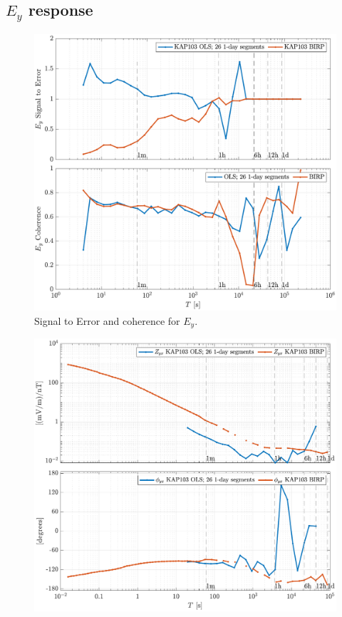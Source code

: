 \documentclass{article}
\begin{document}
\clearpage

\subsection{$E_y$ response}

\begin{figure}[h!]
\centering
\includegraphics[width=\textwidth]{figures/KAP103/SN_compare-E_y.pdf}
\caption{Signal to Error and coherence for $E_y$.}
\label{fig:universe}
\end{figure}

\clearpage

\begin{figure}[h!]
\centering
\includegraphics[width=\textwidth]{figures/KAP103/transferfnZ_compare-Z_yx_Magnitude_Phase.pdf}
\caption{}
\label{fig:universe}
\end{figure}
\end{document}
